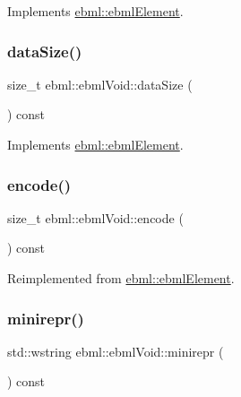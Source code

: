 Implements \mbox{\hyperlink{classebml_1_1ebmlElement_a27bd9de14e1706840235b68331917776}{ebml\+::ebml\+Element}}.

\mbox{\label{classebml_1_1ebmlVoid_a9801f10eb9f0a5449fa39d8a31dbf315}} 
\subsubsection{\texorpdfstring{data\+Size()}{dataSize()}}
{\footnotesize\ttfamily size\+\_\+t ebml\+::ebml\+Void\+::data\+Size (\begin{DoxyParamCaption}{ }\end{DoxyParamCaption}) const\hspace{0.3cm}{\ttfamily [virtual]}}



Implements \mbox{\hyperlink{classebml_1_1ebmlElement_a47ed4167d9c69104e02b6dbad0cd1fef}{ebml\+::ebml\+Element}}.

\mbox{\label{classebml_1_1ebmlVoid_ac822d7bf461ef44812596a34cccb134a}} 
\subsubsection{\texorpdfstring{encode()}{encode()}}
{\footnotesize\ttfamily size\+\_\+t ebml\+::ebml\+Void\+::encode (\begin{DoxyParamCaption}\item[{\mbox{\hyperlink{classebml_1_1ioBase}{io\+Base}} $\ast$}]{ }\end{DoxyParamCaption}) const\hspace{0.3cm}{\ttfamily [virtual]}}



Reimplemented from \mbox{\hyperlink{classebml_1_1ebmlElement_ad493e4103807b8d4434c0667c148dcea}{ebml\+::ebml\+Element}}.

\mbox{\label{classebml_1_1ebmlVoid_ad9baeb00b771d3ae4cdebb2078f863ad}} 
\subsubsection{\texorpdfstring{minirepr()}{minirepr()}}
{\footnotesize\ttfamily std\+::wstring ebml\+::ebml\+Void\+::minirepr (\begin{DoxyParamCaption}{ }\end{DoxyParamCaption}) const\hspace{0.3cm}{\ttfamily [virtual]}}



